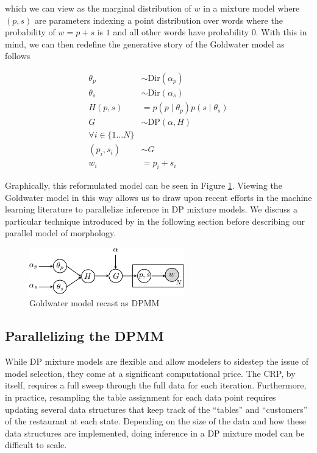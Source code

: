 which we can view as the marginal distribution of $w$ in a mixture
model where $(p,s)$ are parameters indexing a point distribution over
words where the probability of $w = p + s$ is $1$ and all other words
have probability $0$. With this in mind, we can then redefine the
generative story of the Goldwater model as follows

\begin{align*}
  \theta_p & \sim \text{Dir}(\alpha_p) \\
  \theta_s & \sim \text{Dir}(\alpha_s) \\
  H(p, s) & = p(p \mid \theta_p) p(s \mid \theta_s) \\
  G & \sim \text{DP}\left(\alpha, H\right)\\
  \forall i \in \{1 \dots N\} \\
  (p_i, s_i) & \sim G \\
  w_i & = p_i+s_i
\end{align*}

Graphically, this reformulated model can be seen in Figure
\ref{fig:v2}. Viewing the Goldwater model in this way allows us to
draw upon recent efforts in the machine learning literature to
parallelize inference in DP mixture models. We discuss a particular
technique introduced by \cite{williamson2013} in the following section
before describing our parallel model of morphology.

\begin{figure}[h]
\centering
\includegraphics[width=0.6\textwidth]{fig/v2}
\caption{Goldwater model recast as DPMM}
\label{fig:v2}
\end{figure}

\subsection{Parallelizing the DPMM}

While DP mixture models are flexible and allow modelers to sidestep
the issue of model selection, they come at a significant computational
price. The CRP, by itself, requires a full sweep through the full data
for each iteration. Furthermore, in practice, resampling the table
assignment for each data point requires updating several data
structures that keep track of the ``tables'' and ``customers'' of the
restaurant at each state. Depending on the size of the data and how
these data structures are implemented, doing inference in a DP mixture
model can be difficult to scale.

